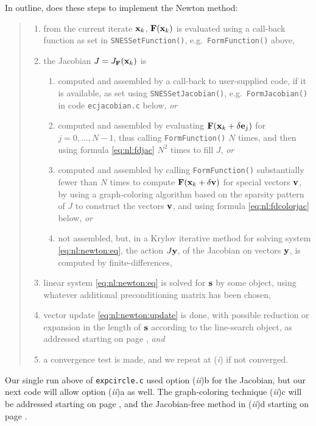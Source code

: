 In outline, \pSNES does these steps to implement the Newton method:
\begin{quote}
	\renewcommand{\labelenumi}{(\emph{\roman{enumi}})}
	\renewcommand{\labelenumii}{\emph{\alph{enumii}}.}
	\begin{enumerate}
	\item from the current iterate $\mathbf{x}_k$, $\mathbf{F}(\mathbf{x}_k)$ is evaluated using a call-back function as set in \texttt{SNESSetFunction()}, e.g.~\texttt{FormFunction()} above,
	\item the Jacobian $J=J_{\mathbf{F}}(\mathbf{x}_k)$ is
	    \begin{enumerate}
	    \item computed and assembled by a call-back to user-supplied code, if it is available, as set using \texttt{SNESSetJacobian()}, e.g.~\texttt{FormJacobian()} in code \texttt{ecjacobian.c} below, \emph{or}
	    \item computed and assembled by evaluating $\mathbf{F}(\mathbf{x}_k+\delta \mathbf{e}_j)$ for $j=0,\dots,N-1$, thus  calling \texttt{FormFunction()} $N$ times, and then using formula \eqref{eq:nl:fdjac} $N^2$ times to fill $J$, \emph{or}
	    \item computed and assembled by calling \texttt{FormFunction()} substantially fewer than $N$ times to compute $\mathbf{F}(\mathbf{x}_k+\delta \mathbf{v})$ for special vectors $\mathbf{v}$, by using a graph-coloring algorithm based on the sparsity pattern of $J$ to construct the vectors $\mathbf{v}$, and using formula \eqref{eq:nl:fdcolorjac} below, \emph{or}
	    \item not assembled, but, in a Krylov iterative method for solving system \eqref{eq:nl:newton:eq}, the action $J \mathbf{y}$, of the Jacobian on vectors $\mathbf{y}$, is computed by finite-differences,
        \end{enumerate}
	\item linear system \eqref{eq:nl:newton:eq} is solved for $\mathbf{s}$ by some \pKSP object, using whatever additional preconditioning matrix has been chosen,
	\item vector update \eqref{eq:nl:newton:update} is done, with possible reduction or expansion in the length of $\mathbf{s}$ according to the line-search object, as addressed starting on page \pageref{sec:linesearch}, \emph{and}
	\item a convergence test is made, and we repeat at (\emph{i}) if not converged.
	\end{enumerate}
\end{quote}

Our single run above of \texttt{expcircle.c} used option (\emph{ii})b for the Jacobian, but our next code will allow option (\emph{ii})a as well.  The graph-coloring technique (\emph{ii})c will be addressed starting on page \pageref{sec:nl:coloring}, and the Jacobian-free method in (\emph{ii})d starting on page \pageref{sec:JFNK}.


